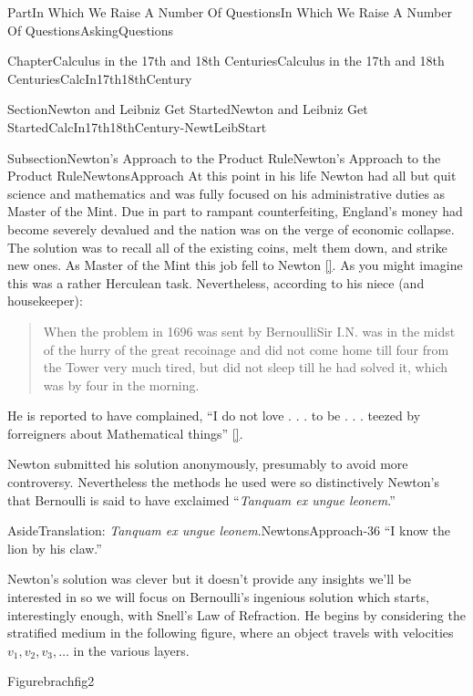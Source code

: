 \documentclass[oneside,10pt,]{book}
\newcommand{\xreffont}{\relax}
\numberwithin{equation}{part}
\begin{document}
\begin{partptx}{Part}{In Which We Raise A Number Of Questions}{}{In Which We Raise A Number Of Questions}{}{}{AskingQuestions}
\begin{chapterptx}{Chapter}{Calculus in the 17th and 18th Centuries}{}{Calculus in the 17th and 18th Centuries}{}{}{CalcIn17th18thCentury}
\begin{sectionptx}{Section}{Newton and Leibniz Get Started}{}{Newton and Leibniz Get Started}{}{}{CalcIn17th18thCentury-NewtLeibStart}
\begin{subsectionptx}{Subsection}{Newton's Approach to the Product Rule}{}{Newton's Approach to the Product Rule}{}{}{NewtonsApproach}
At this point in his life Newton had all but quit science and mathematics and was fully focused on his administrative duties as Master of the Mint.  Due in part to rampant counterfeiting, England's money had become severely devalued and the nation was on the verge of economic collapse.  The solution was to recall all of the existing coins, melt them down, and strike new ones.  As Master of the Mint this job fell to Newton \hyperlink{levenson09__newton_count}{[{\xreffont 8}]}.  As you might imagine this was a rather Herculean task.  Nevertheless, according to his niece (and housekeeper):%
\begin{quote}%
When the problem in 1696 was sent by Bernoulli\textendash{}Sir I.N. was in the midst of the hurry of the great recoinage and did not come home till four from the Tower very much tired, but did not sleep till he had solved it, which was by four in the morning.%
\end{quote}
He is reported to have complained, ``I do not love . . . to be . . . teezed by forreigners about Mathematical things'' \hyperlink{dunham90__journ_throug_genius}{[{\xreffont 2}]}.%
\par
Newton submitted his solution anonymously, presumably to avoid more controversy. Nevertheless the methods he used were so distinctively Newton's that Bernoulli is said to have exclaimed ``\textit{Tanquam ex ungue leonem}.''%
\begin{aside}{Aside}{Translation: \textit{Tanquam ex ungue leonem}.}{NewtonsApproach-36}%
``I know the lion by his claw.''%
\end{aside}
 Newton's solution was clever but it doesn't provide any insights we'll be interested in so we will focus on Bernoulli's ingenious solution which starts, interestingly enough, with Snell's Law of Refraction.  He begins by considering the stratified medium in the following figure, where an object travels with velocities \(v_1, v_2, v_3, \ldots\) in the various layers.%
\begin{figureptx}{Figure}{}{brachfig2}{}%
\begin{image}{0.225}{0.55}{0.225}{}%

\end{image}
\end{figureptx}
\end{subsectionptx}
\end{sectionptx}
\end{chapterptx}
\end{partptx}
\end{document}
